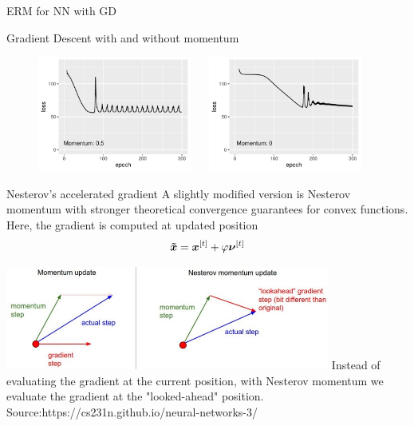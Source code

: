 \documentclass[11pt,compress,t,notes=noshow, xcolor=table]{beamer}
\begin{document}
\begin{vbframe}{ERM for NN with GD}
\framebreak
\begin{center}
    Gradient Descent with and without momentum
\end{center}

\begin{figure}
    \includegraphics[width=0.45\textwidth]{figure_man/gradient_descent_NN_300_history_0.5.pdf} ~~
	\includegraphics[width=0.45\textwidth]{figure_man/gradient_descent_NN_300_history_0.pdf}
\end{figure}

\end{vbframe}





\begin{vbframe}{Nesterov's accelerated gradient}
	A slightly modified version is Nesterov momentum with stronger theoretical convergence guarantees for convex functions. Here, the gradient is computed at updated position 
	$$
	\bm{\Tilde{x}} =  \bm{x}^{[t]} + \varphi \bm{\nu}^{[t]}
	$$
	\begin{center}
		\includegraphics[width = 0.8\textwidth]{figure_man/nesterov.jpeg}
		\footnotesize{Instead of evaluating the gradient at the current position, with Nesterov momentum we evaluate the gradient at the "looked-ahead" position. \\ Source:https://cs231n.github.io/neural-networks-3/}
	\end{center}
\end{vbframe}
\end{document}
